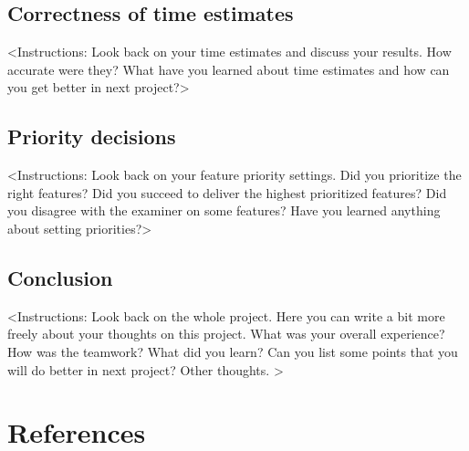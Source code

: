 \documentclass{article}
\begin{document}
\subsection{Correctness of time estimates}
<Instructions: Look back on your time estimates and discuss your results. How accurate were they? What have you learned about time estimates and how can you get better in next project?>

\subsection{Priority decisions}
<Instructions: Look back on your feature priority settings. Did you prioritize the right features? Did you succeed to deliver the highest prioritized features? Did you disagree with the examiner on some features? Have you learned anything about setting priorities?>

\subsection{Conclusion}
<Instructions: Look back on the whole project. Here you can write a bit more freely about your thoughts on this project. What was your overall experience? How was the teamwork? What did you learn? Can you list some points that you will do better in next project? Other thoughts. >

\clearpage

\section{References}
\printbibliography[heading=none]
\end{document}
